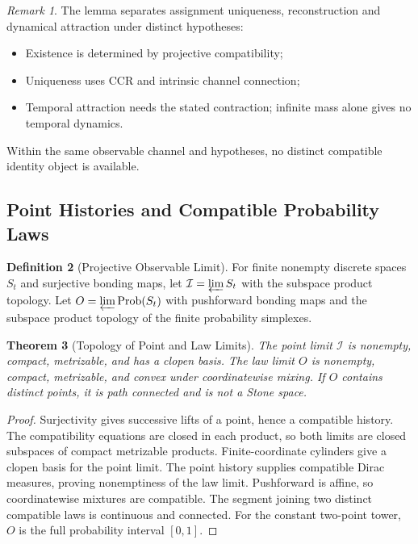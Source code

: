 \documentclass[11pt,a4paper]{article}
\theoremstyle{plain}
\newtheorem{theorem}{Theorem}[section]
\theoremstyle{definition}
\newtheorem{definition}[theorem]{Definition}
\theoremstyle{remark}
\newtheorem{remark}[theorem]{Remark}
\begin{document}
\begin{remark}
The lemma separates assignment uniqueness, reconstruction and dynamical attraction under distinct hypotheses:
\begin{itemize}[leftmargin=*]
    \item Existence is determined by projective compatibility;
    \item Uniqueness uses CCR and intrinsic channel connection;
    \item Temporal attraction needs the stated contraction; infinite mass alone gives no temporal dynamics.
\end{itemize}
Within the same observable channel and hypotheses, no distinct compatible identity object is available.
\end{remark}

\subsection{Point Histories and Compatible Probability Laws}

\begin{definition}[Projective Observable Limit]\label{def:proj-obs-limit}
For finite nonempty discrete spaces $S_t$ and surjective bonding maps, let $\mathcal I=\varprojlim S_t$ with the subspace product topology. Let $O=\varprojlim\mathrm{Prob}(S_t)$ with pushforward bonding maps and the subspace product topology of the finite probability simplexes.
\end{definition}

\begin{theorem}[Topology of Point and Law Limits]\label{thm:stone-classification}
The point limit $\mathcal I$ is nonempty, compact, metrizable, and has a clopen basis. The law limit $O$ is nonempty, compact, metrizable, and convex under coordinatewise mixing. If $O$ contains distinct points, it is path connected and is not a Stone space.
\end{theorem}
\begin{proof}
Surjectivity gives successive lifts of a point, hence a compatible history. The compatibility equations are closed in each product, so both limits are closed subspaces of compact metrizable products. Finite-coordinate cylinders give a clopen basis for the point limit. The point history supplies compatible Dirac measures, proving nonemptiness of the law limit. Pushforward is affine, so coordinatewise mixtures are compatible. The segment joining two distinct compatible laws is continuous and connected. For the constant two-point tower, $O$ is the full probability interval $[0,1]$.
\end{proof}
\end{document}

